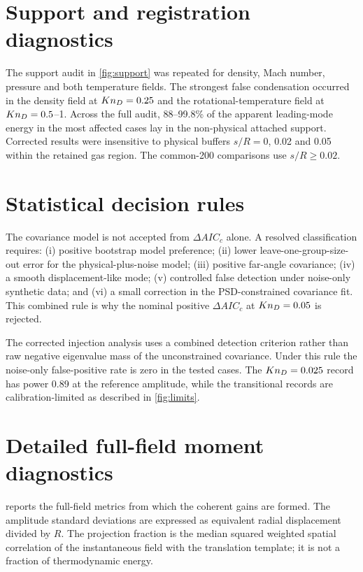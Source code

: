 \appendix
\section{Support and registration diagnostics}
The support audit in \cref{fig:support} was repeated for density, Mach number, pressure and both temperature fields. The strongest false condensation occurred in the density field at $Kn_D=0.25$ and the rotational-temperature field at $Kn_D=0.5$--1. Across the full audit, 88--99.8\% of the apparent leading-mode energy in the most affected cases lay in the non-physical attached support. Corrected results were insensitive to physical buffers $s/R=0$, 0.02 and 0.05 within the retained gas region. The common-200 comparisons use $s/R\geq0.02$.

\section{Statistical decision rules}
The covariance model is not accepted from $\Delta AIC_c$ alone. A resolved classification requires: (i) positive bootstrap model preference; (ii) lower leave-one-group-size-out error for the physical-plus-noise model; (iii) positive far-angle covariance; (iv) a smooth displacement-like mode; (v) controlled false detection under noise-only synthetic data; and (vi) a small correction in the PSD-constrained covariance fit. This combined rule is why the nominal positive $\Delta AIC_c$ at $Kn_D=0.05$ is rejected.

The corrected injection analysis uses a combined detection criterion rather than raw negative eigenvalue mass of the unconstrained covariance. Under this rule the noise-only false-positive rate is zero in the tested cases. The $Kn_D=0.025$ record has power 0.89 at the reference amplitude, while the transitional records are calibration-limited as described in \cref{fig:limits}.

\section{Detailed full-field moment diagnostics}
 reports the full-field metrics from which the coherent gains are formed. The amplitude standard deviations are expressed as equivalent radial displacement divided by $R$. The projection fraction is the median squared weighted spatial correlation of the instantaneous field with the translation template; it is not a fraction of thermodynamic energy.


